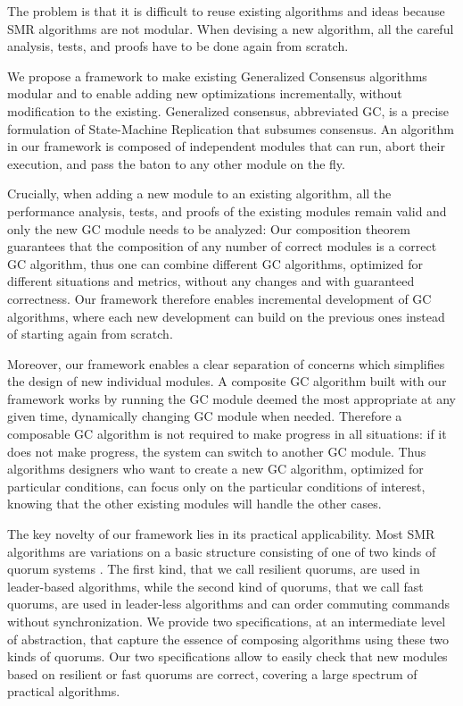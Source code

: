 The problem is that it is difficult to reuse existing algorithms and ideas because
SMR algorithms are not modular. When devising a new algorithm, all the careful
analysis, tests, and proofs have to be done again from scratch.

We propose a framework to make existing Generalized Consensus algorithms modular
and to enable adding new optimizations incrementally, without modification to
the existing. Generalized consensus, abbreviated GC, is a precise formulation of
State-Machine Replication that subsumes consensus. An algorithm in our framework
is composed of independent modules that can run, abort their execution, and pass
the baton to any other module on the fly.

Crucially, when adding a new module to an existing algorithm, all the
performance analysis, tests, and proofs of the existing modules remain valid and
only the new GC module needs to be analyzed: Our composition theorem guarantees
that the composition of any number of correct modules is a correct GC algorithm,
thus one can combine different GC algorithms, optimized for different situations
and metrics, without any changes and with guaranteed correctness. Our framework
therefore enables incremental development of GC algorithms, where each new
development can build on the previous ones instead of starting again from
scratch.

Moreover, our framework enables a clear separation of concerns which simplifies
the design of new individual modules. A composite GC algorithm built with our
framework works by running the GC module deemed the most appropriate at any
given time, dynamically changing GC module when needed. Therefore a composable
GC algorithm is not required to make progress in all situations: if it does
not make progress, the system can switch to another GC module. Thus algorithms
designers who want to create a new GC algorithm, optimized for particular
conditions, can focus only on the particular conditions of interest, knowing
that the other existing modules will handle the other cases.

The key novelty of our framework lies in its practical applicability.
Most SMR algorithms are variations on a basic structure consisting of one of two kinds of 
quorum systems \cite{GuerraouiVukolic10RefinedQuorumSystems}. 
The first kind, that we call resilient quorums, are used in leader-based algorithms, while the second
kind of quorums, that we call fast quorums, are used in leader-less algorithms and can order commuting commands without synchronization.
We provide two specifications, at an intermediate level of abstraction, that capture the essence of composing algorithms using these two kinds of quorums.
Our two specifications allow to easily check that new modules based on resilient or fast quorums are correct, covering a large spectrum of practical algorithms. 

